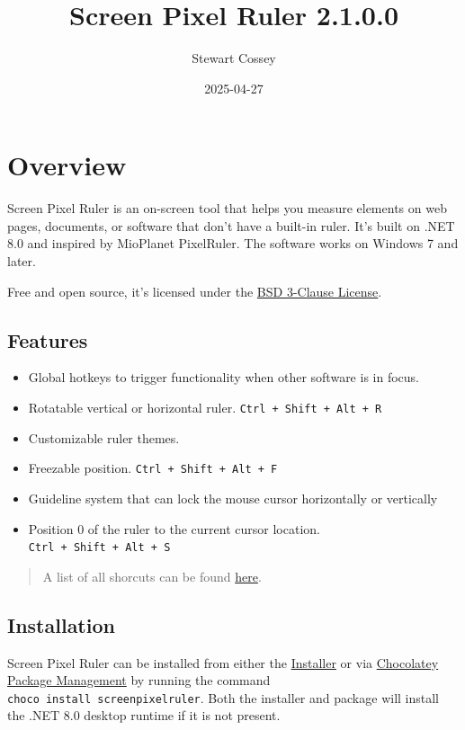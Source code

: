 \documentclass[
]{book}
\title{Screen Pixel Ruler 2.1.0.0}
\author{Stewart Cossey}
\date{2025-04-27}
\providecommand{\tightlist}{%
  \setlength{\itemsep}{0pt}\setlength{\parskip}{0pt}}
\begin{document}
\maketitle

{
\setcounter{tocdepth}{1}
\tableofcontents
}
\chapter{Overview}\label{overview}

Screen Pixel Ruler is an on-screen tool that helps you measure elements on web pages, documents, or software that don't have a built-in ruler.
It's built on .NET 8.0 and inspired by MioPlanet PixelRuler.
The software works on Windows 7 and later.

Free and open source, it's licensed under the \href{https://opensource.org/licenses/BSD-3-Clause}{BSD 3-Clause License}.

\section{Features}\label{features}

\begin{itemize}
\tightlist
\item
  Global hotkeys to trigger functionality when other software is in focus.
\item
  Rotatable vertical or horizontal ruler. \texttt{Ctrl\ +\ Shift\ +\ Alt\ +\ R}
\item
  Customizable ruler themes.
\item
  Freezable position. \texttt{Ctrl\ +\ Shift\ +\ Alt\ +\ F}
\item
  Guideline system that can lock the mouse cursor horizontally or vertically
\item
  Position 0 of the ruler to the current cursor location. \texttt{Ctrl\ +\ Shift\ +\ Alt\ +\ S}
\end{itemize}

\begin{quote}
A list of all shorcuts can be found \hyperref[keyboard]{here}.
\end{quote}

\section{Installation}\label{installation}

Screen Pixel Ruler can be installed from either the \href{https://github.com/Cossey/ScreenPixelRuler2/releases}{Installer} or via \href{https://chocolatey.org}{Chocolatey Package Management} by running the command \texttt{choco\ install\ screenpixelruler}.
Both the installer and package will install the .NET 8.0 desktop runtime if it is not present.
\end{document}
